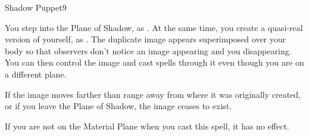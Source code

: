 \begin{spellsection}{Shadow Puppet}{9}
    \begin{spellheader}
    \end{spellheader}
    \begin{spellcontent}
        \spelleffect You step into the Plane of Shadow, as . At the same time, you create a quasi-real version of yourself, as . The duplicate image appears superimposed over your body so that observers don't notice an image appearing and you disappearing. You can then control the image and cast spells through it even though you are on a different plane.
        \spelldur \durshort
    \end{spellcontent}
    \begin{spellfooter}
        \spellnotes If the image moves farther than \rnglong range away from where it was originally created, or if you leave the Plane of Shadow, the image ceases to exist.

        If you are not on the Material Plane when you cast this spell, it has no effect.
        \miscastexplode
    \end{spellfooter}
\end{spellsection}

